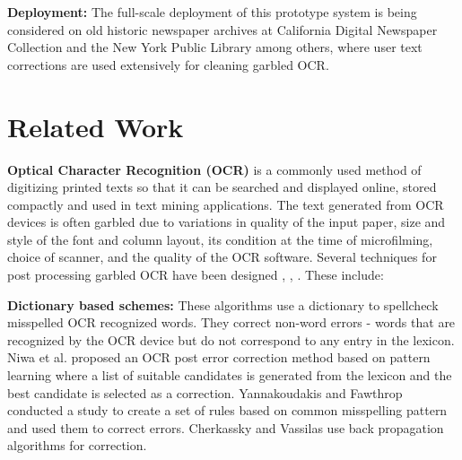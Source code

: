 \documentclass[letterpaper]{article}
\begin{document}
\noindent \textbf{Deployment: }The full-scale deployment of this prototype system is being considered on old historic newspaper archives at California Digital Newspaper Collection and the New York Public Library among others, where  user text corrections are used extensively for cleaning garbled OCR. 

\section{Related Work}
\label{sec:related}
\noindent \textbf{Optical Character Recognition (OCR)} is a commonly used method of digitizing printed texts so that it can be searched and displayed online, stored compactly and used in text mining applications. The text generated from OCR devices is often garbled due to variations in quality of the input paper, size and style of the font and column layout, its condition at the time of microfilming, choice of scanner, and the quality of the OCR software. Several techniques for post processing garbled OCR have been designed \cite{Fujisawa_08}, \cite{Esakov_94}, \cite{Lecun_90}. These include:

\noindent \textbf{Dictionary based schemes: }These algorithms use a dictionary to spellcheck misspelled OCR recognized words. They correct non-word errors - words that are recognized by the OCR device but do not correspond to any entry in the lexicon. Niwa et al. \cite{postprocessing} proposed an OCR post error correction method based on pattern learning where a list of suitable candidates is generated from the lexicon and the best candidate is selected as a correction. Yannakoudakis and Fawthrop \cite{Yannakoudakis_83} conducted a study to create a set of rules based on common misspelling pattern and used them to correct errors. Cherkassky and Vassilas \cite{Cherkassky_89} use back propagation algorithms for correction. 
\end{document}
